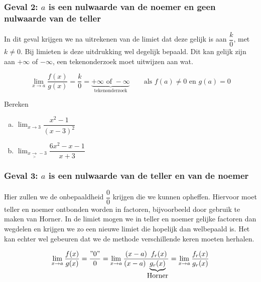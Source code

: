 \documentclass[12pt]{article}
\newenvironment{eigenschap}
{
  \vspace{0.4cm}
  \begin{mdframed}[nobreak=true,frametitle={Eigenschap}]
  }{%
  \end{mdframed}
}
\begin{document}
\begin{theorie}

\subsubsection*{Geval 2: $a$ is een nulwaarde van de noemer en geen nulwaarde van de teller}

In dit geval krijgen we na uitrekenen van de limiet dat deze gelijk is aan $\dfrac{k}{0}$, met $k\neq 0$. Bij limieten is deze uitdrukking wel degelijk bepaald. Dit kan gelijk zijn aan $+\infty$ of $-\infty$, een tekenonderzoek moet uitwijzen aan wat.

\begin{eigenschap}
  $$\lim_{x\to a}\dfrac{f(x)}{g(x)}=\dfrac{k}{0}=\underbrace{+\infty \mbox{ of } -\infty}_{\mbox{tekenonderzoek}} \qquad \mbox{als $f(a)\neq0$ en $g(a)=0$}$$
\end{eigenschap}

\end{theorie}

\begin{oefening}
  Bereken
  \begin{enumerate}[(a)]
  \itemsep.5em
  \item $\displaystyle\lim_{x\to3}\dfrac{x^2-1}{(x-3)^2}$
  \item $\displaystyle\lim_{x\underset{>}{\to}-3}\dfrac{6x^2-x-1}{x+3}$
  \end{enumerate}
\end{oefening}

\begin{theorie}

\subsubsection*{Geval 3: $a$ is een nulwaarde van de teller en van de noemer}

Hier zullen we de onbepaaldheid $\dfrac{0}{0}$ krijgen die we kunnen opheffen. Hiervoor moet teller en noemer ontbonden worden in factoren, bijvoorbeeld door gebruik te maken van Horner. In de limiet mogen we in teller en noemer gelijke factoren dan wegdelen en krijgen we zo een nieuwe limiet die hopelijk dan welbepaald is. Het kan echter wel gebeuren dat we de methode verschillende keren moeten herhalen.

\begin{eigenschap}
  $$\lim_{x\to a}\dfrac{f(x)}{g(x)}=\dfrac{"0"}{0}=\lim_{x\to a}\dfrac{(x-a)\;\;f_r(x)}{(x-a)\underbrace{g_r(x)}_{\mbox{Horner}}}=\lim_{x\to a}\dfrac{f_r(x)}{g_r(x)}$$
\end{eigenschap}

\end{theorie}
\end{document}
